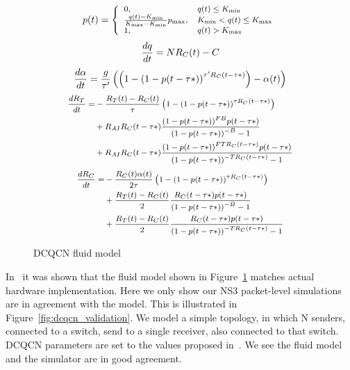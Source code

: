\begin{figure}[h]
\fbox 
{
\begin{minipage}{\columnwidth}
\begin{equation}
\small
p(t) = \left\{ \begin{array}{ll}
{\rm{0,}} & q(t) \le {K_{\min }}\\
\frac{{q(t) - {K_{\min }}}}{{{K_{\max }} - {K_{\min }}}}{p_{\max }}, & {K_{\min }} < q(t) \le {K_{\max }}\\
{\rm{1,}} & q(t) > {K_{\max }}
\end{array} \right.
\label{eq:mark}
\end{equation}
\begin{equation}
\small
\frac{{dq}}{{dt}} = N{R_C}(t) - C
\label{eq:q}
\end{equation}
\begin{equation}
\small
\frac{{d\alpha }}{{dt}} = \frac{g}{{\tau '}}\left( {\left( {1 - {{(1 - p(t - \tau *))}^{\tau '{R_C}(t - \tau *)}}} \right) - \alpha (t)} \right)
\label{eq:alpha}
\end{equation}
\begin{equation}
\small
\begin{split}
\frac{{d{R_T}}}{{dt}} = & - \frac{{{R_T}(t) - {R_C}(t)}}{\tau }\left( {1 - {{(1 - p(t - \tau *))}^{\tau {R_C}(t - \tau *)}}} \right) \\
& + {R_{AI}}{R_C}(t - \tau *)\frac{{{{(1 - p(t - \tau *))}^{FB}}p(t - \tau *)}}{{{{(1 - p(t - \tau *))}^{ - B}} - 1}} \\
& + {R_{AI}}{R_C}(t - \tau *)\frac{{{{(1 - p(t - \tau *))}^{FT{R_C}(t - \tau *)}}p(t - \tau *)}}{{{{(1 - p(t - \tau *))}^{ - T{R_C}(t - \tau *)}} - 1}}
\end{split}
\label{eq:rt}
\end{equation}
\begin{equation}
\small
\begin{split}
\frac{{d{R_C}}}{{dt}} = & - \frac{{{R_C}(t)\alpha (t)}}{{2\tau }}\left( {1 - {{(1 - p(t - \tau *))}^{\tau {R_C}(t - \tau *)}}} \right) \\
 & + \frac{{{R_T}(t) - {R_C}(t)}}{2}\frac{{{R_C}(t - \tau *)p(t - \tau *)}}{{{{(1 - p(t - \tau *))}^{ - B}} - 1}} \\ 
 & + \frac{{{R_T}(t) - {R_C}(t)}}{2}\frac{{{R_C}(t - \tau *)p(t - \tau *)}}{{{{(1 - p(t - \tau *))}^{ - T{R_C}(t - \tau *)}} - 1}}
\end{split}
\label{eq:rc}
\end{equation}
\end{minipage}
}
\caption{DCQCN fluid model}
\label{fig:dcqcn_model}
\end{figure}

In~\cite{dcqcn} it was shown that the fluid model shown in
Figure~\ref{fig:dcqcn_model} matches actual hardware implementation. Here we
only show our NS3 packet-level simulations are in agreement with the model. This
is illustrated in Figure~\ref{fig:dcqcn_validation}. We model a simple topology,
in which N senders, connected to a switch, send to a single receiver, also
connected to that switch. DCQCN parameters are set to the values proposed
in~\cite{dcqcn}.  We see the fluid model and the simulator are in good
agreement.


